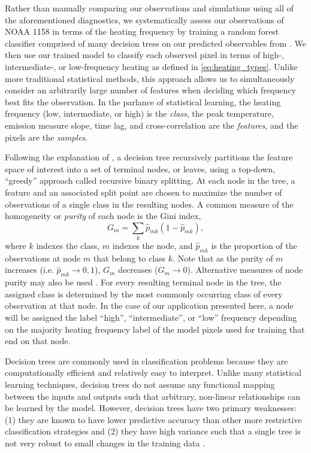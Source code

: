 Rather than manually comparing our observations and simulations using all of the aforementioned diagnostics, we systematically assess our observations of NOAA 1158 in terms of the heating frequency by training a random forest classifier comprised of many decision tress on our predicted observables from .
We then use our trained model to classify each observed pixel in terms of high-, intermediate-, or low-frequency heating as defined in \autoref{eq:heating_types}.
Unlike more traditional statistical methods, this approach allows us to simultaneously consider an arbitrarily large number of features when deciding which frequency best fits the observation.
In the parlance of statistical learning, the heating frequency (low, intermediate, or high) is the \textit{class}, the peak temperature, emission measure slope, time lag, and cross-correlation are the \textit{features}, and the pixels are the \textit{samples}.

Following the explanation of \citet[chapter 8]{james_introduction_2013}, a decision tree recursively partitions the feature space of interest into a set of terminal nodes, or leaves, using a top-down, ``greedy'' approach called recursive binary splitting.
At each node in the tree, a feature and an associated split point are chosen to maximize the number of observations of a single class in the resulting nodes.
A common measure of the homogeneity or \textit{purity} of each node is the Gini index,
\begin{equation}\label{eq:gini-index}
    G_m = \sum_k \hat{p}_{mk} (1 - \hat{p}_{mk}),
\end{equation}
where $k$ indexes the class, $m$ indexes the node, and $\hat{p}_{mk}$ is the proportion of the observations at node $m$ that belong to class $k$.
Note that as the purity of $m$ increases (i.e. $\hat{p}_{mk}\to0,1$), $G_m$ decreases ($G_m\to0$).
Alternative measures of node purity may also be used \citep[see section 9.2.3 of][]{hastie_elements_2009}.
For every resulting terminal node in the tree, the assigned class is determined by the most commonly occurring class of every observation at that node.
In the case of our application presented here, a node will be assigned the label ``high'', ``intermediate'', or ``low'' frequency depending on the majority heating frequency label of the model pixels used for training that end on that node.

Decision trees are commonly used in classification problems because they are computationally efficient and relatively easy to interpret.
Unlike many statistical learning techniques, decision trees do not assume any functional mapping between the inputs and outputs such that arbitrary, non-linear relationships can be learned by the model.
However, decision trees have two primary weaknesses: (1) they are known to have lower predictive accuracy than other more restrictive classification strategies and (2) they have high variance such that a single tree is not very robust to small changes in the training data \citep{james_introduction_2013}.

